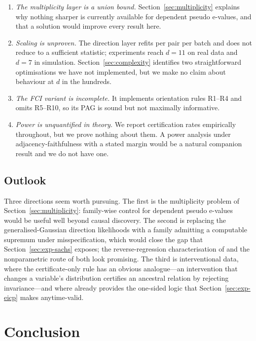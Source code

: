 \documentclass[pdflatex,sn-apa]{sn-jnl}
\theoremstyle{thmstyleone}%
\theoremstyle{thmstyletwo}%
\theoremstyle{thmstylethree}%
\begin{document}
\begin{enumerate}
\item \emph{The multiplicity layer is a union bound.}
  Section~\ref{sec:multiplicity} explains why nothing sharper is currently
  available for dependent pseudo e-values, and that a solution would improve
  every result here.

\item \emph{Scaling is unproven.} The direction layer refits per pair per
  batch and does not reduce to a sufficient statistic; experiments reach
  $d = 11$ on real data and $d = 7$ in simulation. Section~\ref{sec:complexity}
  identifies two straightforward optimisations we have not implemented, but we
  make no claim about behaviour at $d$ in the hundreds.

\item \emph{The FCI variant is incomplete.} It implements orientation rules
  R1--R4 and omits R5--R10, so its PAG is sound but not maximally informative.

\item \emph{Power is unquantified in theory.} We report certification rates
  empirically throughout, but we prove nothing about them. A power analysis
  under adjacency-faithfulness with a stated margin would be a natural
  companion result and we do not have one.
\end{enumerate}

\subsection{Outlook}

Three directions seem worth pursuing. The first is the multiplicity problem of
Section~\ref{sec:multiplicity}: family-wise control for dependent pseudo
e-values would be useful well beyond causal discovery. The second is replacing
the generalised-Gaussian direction likelihoods with a family admitting a
computable supremum under misspecification, which would close the gap that
Section~\ref{sec:exp-sachs} exposes; the reverse-regression characterisation
of \citet{ding2025gaussdetect} and the nonparametric route of
\citet{he2026sequential} both look promising. The third is interventional
data, where the certificate-only rule has an obvious analogue---an
intervention that changes a variable's distribution certifies an ancestral
relation by rejecting invariance---and where \citet{peters2016causal} already
provides the one-sided logic that Section~\ref{sec:exp-eicp} makes
anytime-valid.

\section{Conclusion}\label{sec:conclusion}
\end{document}
